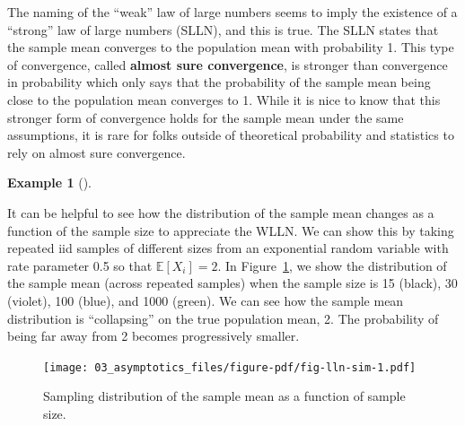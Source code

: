 \documentclass[
  letterpaper,
  DIV=11,
  numbers=noendperiod]{scrreprt}
\newcommand{\E}{\mathbb{E}}
\theoremstyle{definition}
\newtheorem{example}{Example}[chapter]
\theoremstyle{definition}
\theoremstyle{plain}
\theoremstyle{remark}
\begin{document}
\begin{tcolorbox}[enhanced jigsaw, colframe=quarto-callout-note-color-frame, rightrule=.15mm, colback=white, breakable, opacityback=0, coltitle=black, opacitybacktitle=0.6, arc=.35mm, left=2mm, leftrule=.75mm, toptitle=1mm, colbacktitle=quarto-callout-note-color!10!white, titlerule=0mm, title=\textcolor{quarto-callout-note-color}{\faInfo}\hspace{0.5em}{Note}, bottomrule=.15mm, bottomtitle=1mm, toprule=.15mm]

The naming of the ``weak'' law of large numbers seems to imply the
existence of a ``strong'' law of large numbers (SLLN), and this is true.
The SLLN states that the sample mean converges to the population mean
with probability 1. This type of convergence, called \textbf{almost sure
convergence}, is stronger than convergence in probability which only
says that the probability of the sample mean being close to the
population mean converges to 1. While it is nice to know that this
stronger form of convergence holds for the sample mean under the same
assumptions, it is rare for folks outside of theoretical probability and
statistics to rely on almost sure convergence.

\end{tcolorbox}

\begin{example}[]\protect\hypertarget{exm-lln}{}\label{exm-lln}

It can be helpful to see how the distribution of the sample mean changes
as a function of the sample size to appreciate the WLLN. We can show
this by taking repeated iid samples of different sizes from an
exponential random variable with rate parameter 0.5 so that
\(\E[X_i] = 2\). In Figure~\ref{fig-lln-sim}, we show the distribution
of the sample mean (across repeated samples) when the sample size is 15
(black), 30 (violet), 100 (blue), and 1000 (green). We can see how the
sample mean distribution is ``collapsing'' on the true population mean,
2. The probability of being far away from 2 becomes progressively
smaller.

\begin{figure}

{\centering \texttt{[image: 03\_asymptotics\_files/figure-pdf/fig-lln-sim-1.pdf]}

}

\caption{\label{fig-lln-sim}Sampling distribution of the sample mean as
a function of sample size.}

\end{figure}

\end{example}
\end{document}
